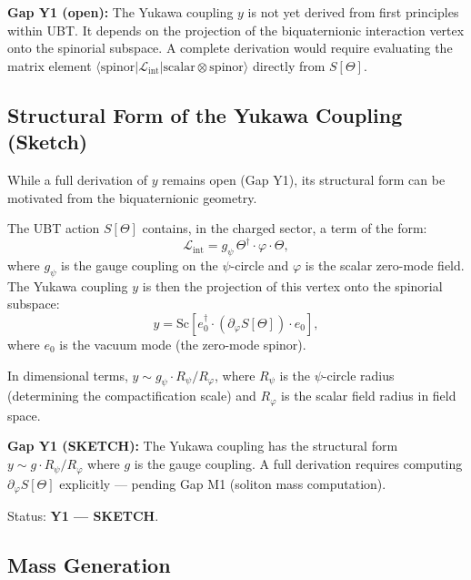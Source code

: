 \documentclass[12pt]{article}
\theoremstyle{definition}
\theoremstyle{remark}
\begin{document}
\begin{gapbox}
\textbf{Gap Y1 (open):} The Yukawa coupling $y$ is not yet derived from first principles
within UBT.  It depends on the projection of the biquaternionic interaction vertex onto
the spinorial subspace.  A complete derivation would require evaluating the matrix element
$\langle\mathrm{spinor}|\mathcal{L}_\mathrm{int}|\mathrm{scalar}\otimes\mathrm{spinor}\rangle$
directly from $S[\Theta]$.
\end{gapbox}

\subsection{Structural Form of the Yukawa Coupling (Sketch)}
\label{subsec:yukawa_sketch}

While a full derivation of $y$ remains open (Gap Y1), its structural form can be
motivated from the biquaternionic geometry.

The UBT action $S[\Theta]$ contains, in the charged sector, a term of the form:
\begin{equation}
  \mathcal{L}_\mathrm{int} = g_\psi\,\Theta^\dagger \cdot \varphi \cdot \Theta,
\end{equation}
where $g_\psi$ is the gauge coupling on the $\psi$-circle and $\varphi$ is the scalar
zero-mode field.  The Yukawa coupling $y$ is then the projection of this vertex onto
the spinorial subspace:
\begin{equation}
  y = \mathrm{Sc}\!\left[e_0^\dagger \cdot (\partial_\varphi S[\Theta]) \cdot e_0\right],
  \label{eq:y_structural}
\end{equation}
where $e_0$ is the vacuum mode (the zero-mode spinor).

In dimensional terms, $y \sim g_\psi \cdot R_\psi / R_\varphi$, where $R_\psi$ is the
$\psi$-circle radius (determining the compactification scale) and $R_\varphi$ is the
scalar field radius in field space.

\begin{gapbox}
\textbf{Gap Y1 (SKETCH):} The Yukawa coupling has the structural form
$y \sim g \cdot R_\psi / R_\varphi$ where $g$ is the gauge coupling.
A full derivation requires computing $\partial_\varphi S[\Theta]$ explicitly ---
pending Gap M1 (soliton mass computation).

Status: \textbf{Y1 — SKETCH}.
\end{gapbox}

\subsection{Mass Generation}
\end{document}
